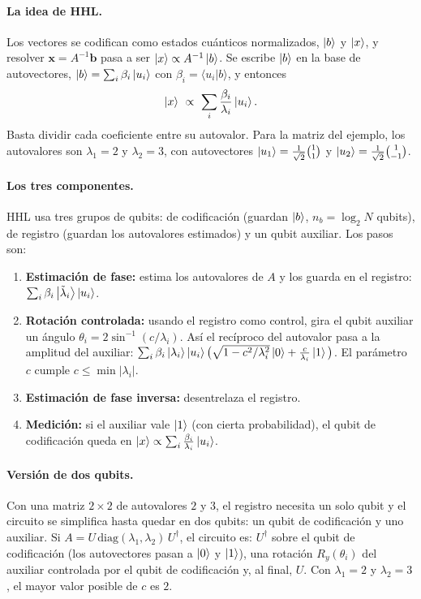 \paragraph{La idea de HHL.} Los vectores se codifican como estados cuánticos
normalizados, $\left|b\right\rangle$ y $\left|x\right\rangle$, y resolver $\mathbf x=A^{-1}\mathbf b$ pasa a ser
$\left|x\right\rangle\propto A^{-1}\left|b\right\rangle$. Se escribe $\left|b\right\rangle$ en la base de autovectores,
$\left|b\right\rangle=\sum_i\beta_i\left|u_i\right\rangle$ con $\beta_i=\langle u_i|b\rangle$, y entonces
\begin{equation}
  \ket x\ \propto\ \sum_i\frac{\beta_i}{\lambda_i}\ket{u_i}.
\end{equation}
Basta dividir cada coeficiente entre su autovalor. Para la matriz del
ejemplo, los autovalores son $\lambda_1=2$ y $\lambda_2=3$, con autovectores
$\left|u_1\right\rangle=\frac1{\sqrt2}\binom11$ y $\left|u_2\right\rangle=\frac1{\sqrt2}\binom1{-1}$.

\paragraph{Los tres componentes.} HHL usa tres grupos de qubits: de codificación
(guardan $\left|b\right\rangle$, $n_b=\log_2N$ qubits), de registro (guardan los autovalores
estimados) y un qubit auxiliar. Los pasos son:
\begin{enumerate}
  \item \textbf{Estimación de fase:} estima los autovalores de $A$ y los guarda en el
    registro: $\sum_i\beta_i\left|\tilde\lambda_i\right\rangle\left|u_i\right\rangle$.
  \item \textbf{Rotación controlada:} usando el registro como control, gira el
    qubit auxiliar un ángulo $\theta_i=2\sin^{-1}(c/\lambda_i)$. Así el
    recíproco del autovalor pasa a la amplitud del auxiliar:
    $\sum_i\beta_i\left|\lambda_i\right\rangle\left|u_i\right\rangle\big(\sqrt{1-c^2/\lambda_i^2}\left|0\right\rangle
    +\frac c{\lambda_i}\left|1\right\rangle\big)$. El parámetro $c$ cumple $c\le\min|\lambda_i|$.
  \item \textbf{Estimación de fase inversa:} desentrelaza el registro.
  \item \textbf{Medición:} si el auxiliar vale $\left|1\right\rangle$ (con cierta probabilidad),
    el qubit de codificación queda en $\left|x\right\rangle\propto\sum_i\frac{\beta_i}{\lambda_i}\left|u_i\right\rangle$.
\end{enumerate}

\paragraph{Versión de dos qubits.} Con una matriz $2\times2$ de autovalores
$2$ y $3$, el registro necesita un solo qubit y el circuito se simplifica
hasta quedar en dos qubits: un qubit de codificación y uno auxiliar. Si
$A=U\,\mathrm{diag}(\lambda_1,\lambda_2)\,U^\dagger$, el circuito es:
$U^\dagger$ sobre el qubit de codificación (los autovectores pasan a $\left|0\right\rangle$ y
$\left|1\right\rangle$), una rotación $R_y(\theta_i)$ del auxiliar controlada por el qubit de
codificación y, al final, $U$. Con $\lambda_1=2$ y $\lambda_2=3$, el mayor valor
posible de $c$ es $2$.

